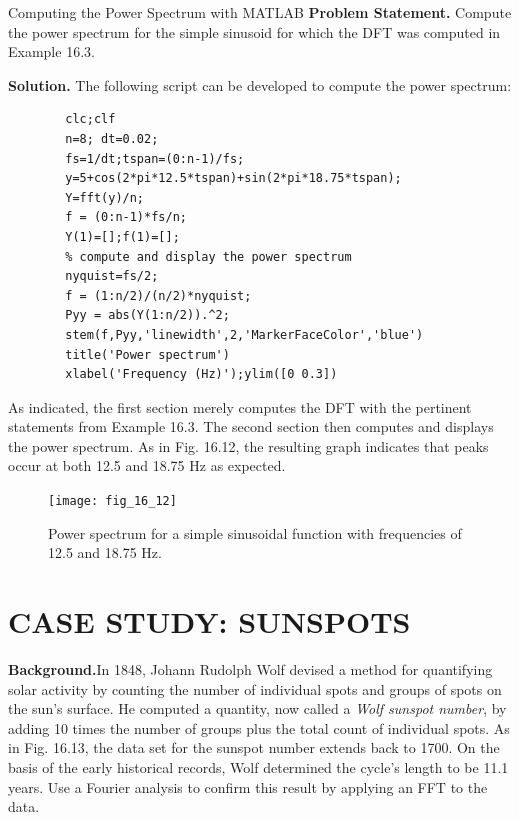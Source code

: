 \documentclass[../main.tex]{subfiles}
\begin{document}
\begin{example}  Computing the Power Spectrum with MATLAB
	\noindent \textbf{Problem Statement. } \quad Compute the power spectrum for the simple sinusoid for which the
	DFT was computed in Example 16.3.

	\noindent \textbf{Solution. } \quad  The following script can be developed to compute the power spectrum:

	\begin{lstlisting}[numbers=none]
		% compute the DFT
		clc;clf
		n=8; dt=0.02;
		fs=1/dt;tspan=(0:n-1)/fs;
		y=5+cos(2*pi*12.5*tspan)+sin(2*pi*18.75*tspan);
		Y=fft(y)/n;
		f = (0:n-1)*fs/n;
		Y(1)=[];f(1)=[];
		% compute and display the power spectrum
		nyquist=fs/2;
		f = (1:n/2)/(n/2)*nyquist;
		Pyy = abs(Y(1:n/2)).^2;
		stem(f,Pyy,'linewidth',2,'MarkerFaceColor','blue')
		title('Power spectrum')
		xlabel('Frequency (Hz)');ylim([0 0.3])
	\end{lstlisting}

	\noindent As indicated, the first section merely computes the DFT with the pertinent statements from
	Example 16.3. The second section then computes and displays the power spectrum. As in
	Fig. 16.12, the resulting graph indicates that peaks occur at both 12.5 and 18.75 Hz as
	expected.

	\begin{figure}[H] 
		\centering
		\texttt{[image: fig\_16\_12]}
		\caption{\textsf{Power spectrum for a simple sinusoidal function with frequencies of 12.5 and 18.75 Hz.}}
		\label{fig:fig_16_12}
	\end{figure}
\end{example}


\section[CASE STUDY: SUNSPOTS]{CASE STUDY: SUNSPOTS}
\noindent\textbf{Background.}\quad  In 1848, Johann Rudolph Wolf devised a method for quantifying solar
activity by counting the number of individual spots and groups of spots on the sun's surface. He computed a quantity, now called a \textit{Wolf sunspot number}, by adding 10 times the
number of groups plus the total count of individual spots. As in Fig. 16.13, the data set for
the sunspot number extends back to 1700. On the basis of the early historical records, Wolf
determined the cycle's length to be 11.1 years. Use a Fourier analysis to confirm this result
by applying an FFT to the data.
\end{document}
